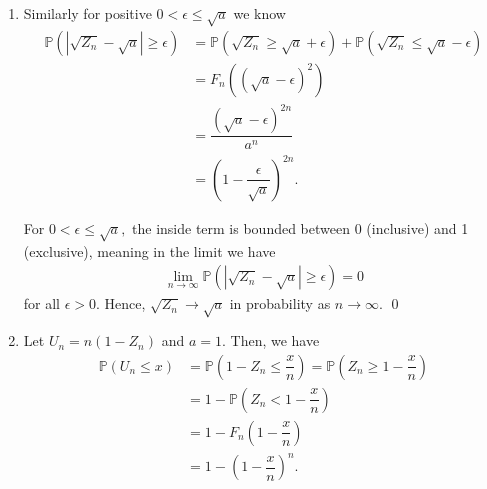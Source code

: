 \documentclass[12pt]{article}
\begin{document}
\begin{enumerate}
\begin{enumerate}
        Hence, for $a \geq \epsilon > 0,$ we know
        \begin{align*}
          \mathbb P(|Z_n - a| \geq \epsilon) &= \mathbb P(\{Z_n \geq a + \epsilon\} \cup \{Z_n \leq a - \epsilon \})  \\
          &= 0 + \mathbb P(Z_n \leq a - \epsilon) \\
          &= \int_{0}^{a - \epsilon} \dfrac{n}{a^{n}} z^{n-1} \, dz \\
          &= \dfrac{(a - \epsilon)^n}{a^n} \\
          &= \left(1 - \dfrac{\epsilon}{a}\right)^n.
        \end{align*}

        Taking the limit as $n \to \infty$ yields
        \begin{align*}
          \lim_{n \to \infty} \mathbb P(|Z_n - a| \geq \epsilon) = \lim_{n \to \infty} \left(1 - \dfrac{\epsilon}{a}\right)^n  = 0
        \end{align*}
        whenever $\epsilon > 0,$ since $1 - \epsilon / a < 1.$ When $\epsilon > a,$ probability is always $0$ (trivial).

        Therefore, $Z_n \to a$ in probability as $n \to \infty.$ \qed

      \item Similarly for positive $0 < \epsilon \leq \sqrt{a}$ we know
        \begin{align*}
          \mathbb P(|\sqrt{Z_n} - \sqrt{a}| \geq \epsilon) &= \mathbb P(\sqrt{Z_n} \geq \sqrt{a} + \epsilon) + \mathbb P(\sqrt{Z_n} \leq \sqrt{a} - \epsilon) \\
          &= F_n((\sqrt{a} - \epsilon)^2) \\
          &= \dfrac{(\sqrt{a} - \epsilon)^{2n}}{a^n} \\
          &= \left (1 - \dfrac{\epsilon}{\sqrt{a}}\right)^{2n}.
        \end{align*}

        For $0 < \epsilon \leq \sqrt{a},$ the inside term is bounded between 0 (inclusive) and 1 (exclusive), meaning in the limit we have
        \begin{align*}
          \lim_{n \to \infty} \mathbb P(|\sqrt{Z_n} - \sqrt{a}| \geq \epsilon) = 0
        \end{align*}
        for all $\epsilon > 0.$ Hence, $\sqrt{Z_n} \to \sqrt{a}$ in probability as $n \to \infty.$ \qed

      \item Let $U_n = n(1 - Z_n)$ and $a = 1.$ Then, we have
        \begin{align*}
          \mathbb P(U_n \leq x) &= \mathbb P\left(1 - Z_n \leq \dfrac{x}{n}\right) = \mathbb P\left(Z_n \geq 1 - \dfrac{x}{n}\right) \\
          &= 1- \mathbb P\left(Z_n < 1 - \dfrac{x}{n}\right) \\
          &= 1 - F_n\left(1 - \dfrac{x}{n}\right) \\
          &= 1-\left(1 - \dfrac{x}{n}\right)^{n}.
        \end{align*}


\end{enumerate}
\end{enumerate}
\end{document}
